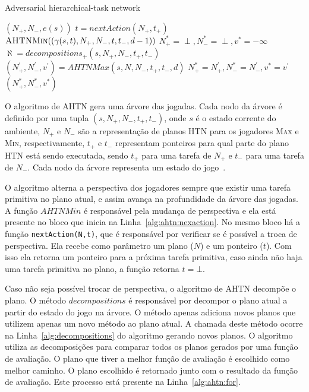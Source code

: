 \begin{algorithm}
	\caption{Adversarial hierarchical-task network}
	\label{alg:ahtn}
	\begin{algorithmic}[1]		
		\label{alg:lin:firstLine}
		\State	\Return $(N_{+}, N_{-}, e(s))$
		\EndIf
		 \label{alg:ahtn:nexaction}
		\State $t = nextAction(N_{+}, t_{+})$ 
		\State \Return $\Call{AHTNMin}{(\gamma(s,t), N_{+}, N_{-}, t, t_{-}, d-1)}$ \label{alg:ahtn:troca}
		\EndIf
		\State $N_{+}^{*} = \perp, N_{-}^{*} = \perp, v^{*} = -\infty$
		\State $\aleph = decompositions_{+}(s, N_{+}, N_{-}, t_{+}, t_{-})$ \label{alg:decompositions}
		 \label{alg:ahtn:for}
		\State $(N^{'}_{+}, N^{'}_{-}, v^{'}) = AHTNMax(s, N, N_{-}, t_{+}, t_{-}, d)$
		\State $N_{+}^{*} = N^{'}_{+}, N_{-}^{*} = N^{'}_{-}, v^{*} = v^{'} $
		\EndIf
		\EndFor		
		\State \Return $(N_{+}^{*}, N_{-}^{*}, v^{*} )$
		\EndFunction
	\end{algorithmic}
\end{algorithm}

O algoritmo de AHTN gera uma árvore das jogadas. Cada nodo da árvore é definido por uma tupla $(s, N_{+}, N_{-}, t_{+}, t_{-})$, onde $s$ é o estado corrente do ambiente, $N_{+}$ e $N_{-}$ são a representação de planos HTN para os jogadores \textsc{Max} e \textsc{Min}, respectivamente, $t_{+}$ e $t_{-}$ representam ponteiros para qual parte do plano HTN está sendo executada, sendo $t_{+}$ para uma tarefa de $N_{+}$ e $t_{-}$ para uma tarefa de $N_{-}$. Cada nodo da árvore representa um estado do jogo~\cite{ontanon2015adversarial}.

O algoritmo alterna a perspectiva dos jogadores sempre que existir uma tarefa primitiva no plano atual, e assim avança na profundidade da árvore das jogadas. A função $AHTNMin$ é responsável pela mudança de perspectiva e ela está presente no bloco que inicia na Linha~\ref{alg:ahtn:nexaction}. No mesmo bloco há a função \texttt{nextAction(N,t)}, que é responsável por verificar se é possível a troca de perspectiva. Ela recebe como parâmetro um plano ($N$) e um ponteiro ($t$). Com isso ela retorna um ponteiro para a próxima tarefa primitiva, caso ainda não haja uma tarefa primitiva no plano, a função retorna $t = \bot$.

Caso não seja possível trocar de perspectiva, o algoritmo de AHTN decompõe o plano. O método $decompositions$ é responsável por decompor o plano atual a partir do estado do jogo na árvore. O método apenas adiciona novos planos que utilizem apenas um novo método ao plano atual. A chamada deste método ocorre na Linha~\ref{alg:decompositions} do algoritmo gerando novos planos.
O algoritmo utiliza as decomposições para comparar todos os planos gerados por uma função de avaliação. O plano que tiver a melhor função de avaliação é escolhido como melhor caminho. O plano escolhido é retornado junto com o resultado da função de avaliação. Este processo está presente na Linha~\ref{alg:ahtn:for}.

